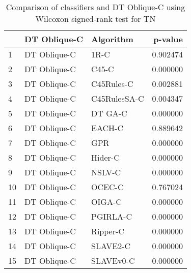 \begin{table}
\footnotesize
\caption{Comparison of classifiers and DT Oblique-C using Wilcoxon signed-rank test for TN}
\label{tab:DT Oblique-C wilcoxon TN comparison}
\begin{tabular}{lllr}
\hline
 & DT Oblique-C & Algorithm & p-value \\
\hline
1 & DT Oblique-C & 1R-C & 0.902474 \\
2 & DT Oblique-C & C45-C & 0.000000 \\
3 & DT Oblique-C & C45Rules-C & 0.002881 \\
4 & DT Oblique-C & C45RulesSA-C & 0.004347 \\
5 & DT Oblique-C & DT GA-C & 0.000000 \\
6 & DT Oblique-C & EACH-C & 0.889642 \\
7 & DT Oblique-C & GPR & 0.000000 \\
8 & DT Oblique-C & Hider-C & 0.000000 \\
9 & DT Oblique-C & NSLV-C & 0.000000 \\
10 & DT Oblique-C & OCEC-C & 0.767024 \\
11 & DT Oblique-C & OIGA-C & 0.000000 \\
12 & DT Oblique-C & PGIRLA-C & 0.000000 \\
13 & DT Oblique-C & Ripper-C & 0.000000 \\
14 & DT Oblique-C & SLAVE2-C & 0.000000 \\
15 & DT Oblique-C & SLAVEv0-C & 0.000000 \\
\hline
\end{tabular}
\end{table}
